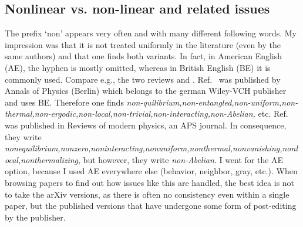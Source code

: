 \subsection{Nonlinear vs. non-linear and related issues}
The prefix `non' appears very often and with many different following words. My impression was that it is not treated uniformly in the literature (even by the same authors) and that one finds both variants. In fact, in American English (AE), the hyphen is mostly omitted, whereas in British English (BE) it is commonly used. Compare e.g., the two reviews \cite{abaninRecentProgressManybody2017} and \cite{abaninColloquiumManybodyLocalization2019}. Ref.~\cite{abaninRecentProgressManybody2017} was published by Annals of Physics (Berlin) which belongs to the german Wiley-VCH publisher and uses BE. Therefore one finds \emph{non-quilibrium,non-entangled,non-uniform,non-thermal,non-ergodic,non-local,non-trivial,non-interacting,non-Abelian,} etc.
Ref.~\cite{abaninColloquiumManybodyLocalization2019} was published in Reviews of modern physics, an APS journal. In consequence, they write \emph{nonequilibrium,nonzero,noninteracting,nonuniform,nonthermal,nonvanishing,nonlocal,nonthermalizing}, but however, they write \emph{non-Abelian}. I went for the AE option, because I used AE everywhere else (behavior, neighbor, gray, etc.).
When browsing papers to find out how issues like this are handled, the best idea is not to take the arXiv versions, as there is often no consistency even within a single paper, but the published versions that have undergone some form of post-editing by the publisher.
